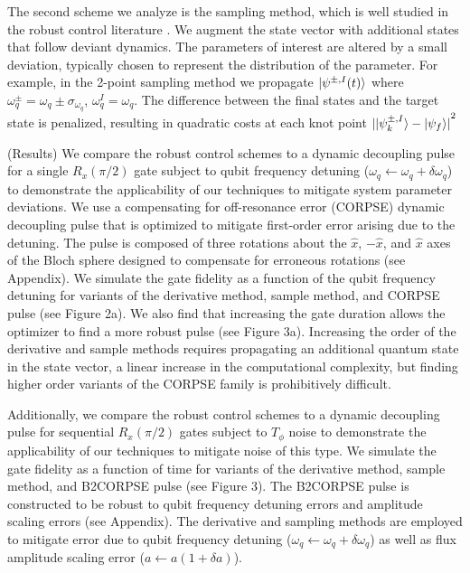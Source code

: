 \documentclass[
  amsfonts,
  amsmath,
  tbtags,
  amssymb,
  aps,
  nobibnotes,
  twocolumn,
]{revtex4-2}
\begin{document}
The second scheme we analyze is the sampling method,
which is well studied in the robust control literature
\cite{manchester2016derivative} \cite{tronarp2016sigma}.
We augment the state vector with additional
states that follow deviant dynamics. The parameters of interest
are altered by a small deviation, typically chosen
to represent the distribution of the parameter.
For example, in the 2-point sampling method we
propagate $\ket{\psi^{\pm, I}(t)}$ where
$\omega_{q}^{\pm} = \omega_{q} \pm \sigma_{\omega_{q}}$,
$\omega_{q}^{I} = \omega_{q}$.
The difference between the final states and the target
state is penalized, resulting in quadratic costs at
each knot point
${\lvert \ket{\psi^{\pm, I}_{k}} - \ket{\psi_{f}} \rvert}^{2}$

(Results) We compare the robust control
schemes to a dynamic decoupling pulse
for a single $R_{x}(\pi/2)$ gate
subject to qubit frequency detuning
($\omega_{q} \gets \omega_{q} + \delta \omega_{q}$)
to demonstrate the applicability of our techniques to mitigate
system parameter deviations.
We use a compensating for off-resonance error
(CORPSE) dynamic decoupling pulse that is optimized
to mitigate first-order error arising due to the detuning.
The pulse is composed of
three rotations about the $\hat{x}$, $-\hat{x}$, and $\hat{x}$ axes
of the Bloch sphere
designed to compensate for erroneous rotations
(see Appendix). We simulate the gate fidelity as
a function of the qubit frequency detuning for
variants of the
derivative method, sample method, and
CORPSE pulse (see Figure 2a). We also find that
increasing the gate duration allows the optimizer
to find a more robust pulse
(see Figure 3a). Increasing the order of the derivative
and sample methods requires propagating an additional quantum state
in the state vector, a linear increase
in the computational complexity, but finding higher order
variants of the CORPSE family is prohibitively difficult.

Additionally, we compare the robust control
schemes to a dynamic decoupling pulse
for sequential $R_{x}(\pi/2)$ gates
subject to $T_{\phi}$ noise to demonstrate the applicability
of our techniques to mitigate noise of this type.
We simulate the gate fidelity as a function of time
for variants of the derivative method,
sample method, and B2CORPSE pulse (see Figure 3).
The B2CORPSE pulse is constructed to be robust
to qubit frequency detuning errors and
amplitude scaling errors (see Appendix).
The derivative and sampling methods are employed to
mitigate error due to qubit frequency detuning
($\omega_{q} \gets \omega_{q} + \delta \omega_{q}$)
as well as flux amplitude scaling error
($a \gets a (1 + \delta a)$).
\end{document}
